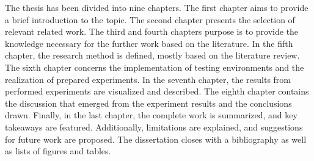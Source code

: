 The thesis has been divided into nine chapters. The first chapter aims to provide a brief introduction to the topic. The second chapter presents the selection of relevant related work. The third and fourth chapters purpose is to provide the knowledge necessary for the further work based on the literature. In the fifth chapter, the research method is defined, mostly based on the literature review. The sixth chapter concerns the implementation of testing environments and the realization of prepared experiments. In the seventh chapter, the results from performed experiments are visualized and described. The eighth chapter contains the discussion that emerged from the experiment results and the conclusions drawn. Finally, in the last chapter, the complete work is summarized, and key takeaways are featured. Additionally, limitations are explained, and suggestions for future work are proposed. The dissertation closes with a bibliography as well as lists of figures and tables.
\clearpage
